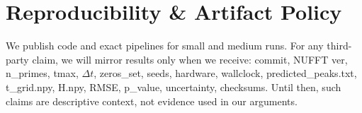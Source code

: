 \documentclass[11pt]{article}
\begin{document}
\section{Reproducibility \& Artifact Policy}
We publish code and exact pipelines for small and medium runs. For any third-party claim, we will mirror results only when we receive: {commit, NUFFT ver, n_primes, tmax, $\Delta t$, zeros_set, seeds, hardware, wallclock, predicted_peaks.txt, t_grid.npy, H.npy, RMSE, p_value, uncertainty, checksums}. Until then, such claims are descriptive context, not evidence used in our arguments.



\end{document}
